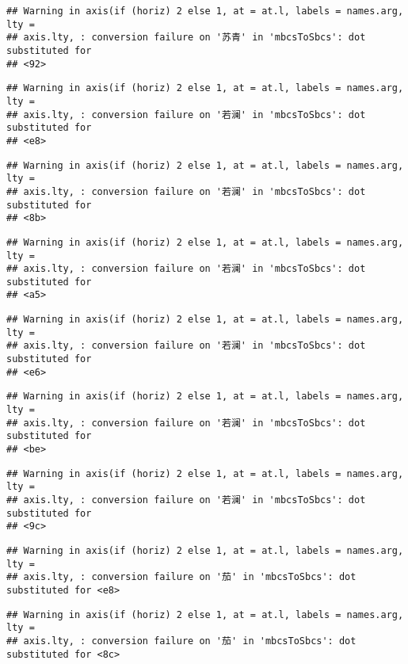 \documentclass[
]{article}
\begin{document}
\begin{verbatim}
## Warning in axis(if (horiz) 2 else 1, at = at.l, labels = names.arg, lty =
## axis.lty, : conversion failure on '苏青' in 'mbcsToSbcs': dot substituted for
## <92>
\end{verbatim}

\begin{verbatim}
## Warning in axis(if (horiz) 2 else 1, at = at.l, labels = names.arg, lty =
## axis.lty, : conversion failure on '若澜' in 'mbcsToSbcs': dot substituted for
## <e8>
\end{verbatim}

\begin{verbatim}
## Warning in axis(if (horiz) 2 else 1, at = at.l, labels = names.arg, lty =
## axis.lty, : conversion failure on '若澜' in 'mbcsToSbcs': dot substituted for
## <8b>
\end{verbatim}

\begin{verbatim}
## Warning in axis(if (horiz) 2 else 1, at = at.l, labels = names.arg, lty =
## axis.lty, : conversion failure on '若澜' in 'mbcsToSbcs': dot substituted for
## <a5>
\end{verbatim}

\begin{verbatim}
## Warning in axis(if (horiz) 2 else 1, at = at.l, labels = names.arg, lty =
## axis.lty, : conversion failure on '若澜' in 'mbcsToSbcs': dot substituted for
## <e6>
\end{verbatim}

\begin{verbatim}
## Warning in axis(if (horiz) 2 else 1, at = at.l, labels = names.arg, lty =
## axis.lty, : conversion failure on '若澜' in 'mbcsToSbcs': dot substituted for
## <be>
\end{verbatim}

\begin{verbatim}
## Warning in axis(if (horiz) 2 else 1, at = at.l, labels = names.arg, lty =
## axis.lty, : conversion failure on '若澜' in 'mbcsToSbcs': dot substituted for
## <9c>
\end{verbatim}

\begin{verbatim}
## Warning in axis(if (horiz) 2 else 1, at = at.l, labels = names.arg, lty =
## axis.lty, : conversion failure on '茄' in 'mbcsToSbcs': dot substituted for <e8>
\end{verbatim}

\begin{verbatim}
## Warning in axis(if (horiz) 2 else 1, at = at.l, labels = names.arg, lty =
## axis.lty, : conversion failure on '茄' in 'mbcsToSbcs': dot substituted for <8c>
\end{verbatim}
\end{document}

